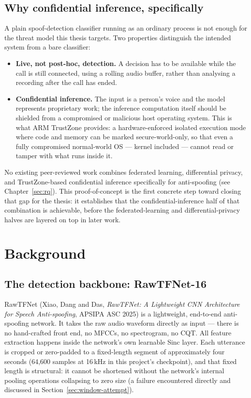 \documentclass[11pt,a4paper]{report}
\begin{document}
\section{Why confidential inference, specifically}

A plain spoof-detection classifier running as an ordinary process is not enough for the threat
model this thesis targets. Two properties distinguish the intended system from a bare classifier:

\begin{itemize}[leftmargin=1.4em]
  \item \textbf{Live, not post-hoc, detection.} A decision has to be available while the call is
  still connected, using a rolling audio buffer, rather than analysing a recording after the call
  has ended.
  \item \textbf{Confidential inference.} The input is a person's voice and the model represents
  proprietary work; the inference computation itself should be shielded from a compromised or
  malicious host operating system. This is what ARM TrustZone provides: a hardware-enforced
  isolated execution mode where code and memory can be marked secure-world-only, so that even a
  fully compromised normal-world OS --- kernel included --- cannot read or tamper with what runs
  inside it.
\end{itemize}

No existing peer-reviewed work combines federated learning, differential privacy, and
TrustZone-based confidential inference specifically for anti-spoofing (see Chapter~\ref{sec:rq}).
This proof-of-concept is the first concrete step toward closing that gap for the thesis: it
establishes that the confidential-inference half of that combination is achievable, before the
federated-learning and differential-privacy halves are layered on top in later work.

\chapter{Background}

\section{The detection backbone: RawTFNet-16}
\label{sec:rawtfnet}

RawTFNet (Xiao, Dang and Das, \textit{RawTFNet: A Lightweight CNN Architecture for Speech
Anti-spoofing}, APSIPA ASC 2025) is a lightweight, end-to-end anti-spoofing network. It takes the
raw audio waveform directly as input --- there is no hand-crafted front end, no MFCCs, no
spectrogram, no CQT. All feature extraction happens inside the network's own learnable Sinc layer.
Each utterance is cropped or zero-padded to a fixed-length segment of approximately four seconds
(64,600 samples at 16\,kHz in this project's checkpoint), and that fixed length is structural: it
cannot be shortened without the network's internal pooling operations collapsing to zero size (a
failure encountered directly and discussed in Section~\ref{sec:window-attempt}).
\end{document}
